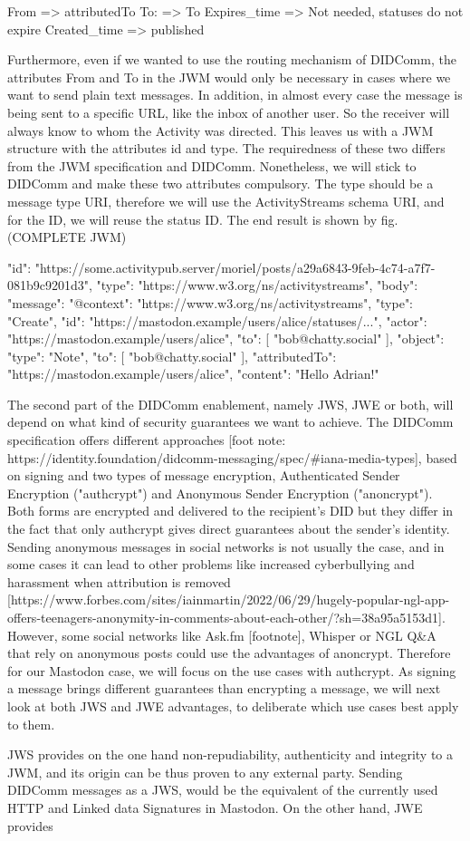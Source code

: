 From => attributedTo
To: => To 
Expires_time => Not needed, statuses do not expire
Created_time => published

Furthermore, even if we wanted to use the routing mechanism of DIDComm, the attributes From and To in the JWM would only be necessary in cases where we want to send plain text messages. In addition, in almost every case the message is being sent to a specific URL, like the inbox of another user. So the receiver will always know to whom the Activity was directed.
This leaves us with a JWM structure with the attributes id and type. The requiredness of these two differs from the JWM specification and DIDComm. Nonetheless, we will stick to DIDComm and make these two attributes compulsory. The type should be a message type URI, therefore we will use the ActivityStreams schema URI, and for the ID, we will reuse the status ID. The end result  is shown by fig. (COMPLETE JWM)

{
  "id": "https://some.activitypub.server/moriel/posts/a29a6843-9feb-4c74-a7f7-081b9c9201d3",
  "type": "https://www.w3.org/ns/activitystreams",
  "body": {
    "message": {
      "@context": "https://www.w3.org/ns/activitystreams",
      "type": "Create",
      "id": "https://mastodon.example/users/alice/statuses/...",
      "actor": "https://mastodon.example/users/alice",
      "to": [ 
            "bob@chatty.social"
        ],
      "object": {
        "type": "Note",
        "to": [ 
            "bob@chatty.social"
        ],
        "attributedTo": "https://mastodon.example/users/alice",
        "content": "Hello Adrian!"
      }
    }
  }
}

The second part of the DIDComm enablement, namely JWS, JWE or both, will depend on what kind of security guarantees we want to achieve. The DIDComm specification offers different approaches [foot note: https://identity.foundation/didcomm-messaging/spec/#iana-media-types], based on signing and two types of message encryption, Authenticated Sender Encryption ("authcrypt") and Anonymous Sender Encryption ("anoncrypt"). Both forms are encrypted and delivered to the recipient's DID but they differ in the fact that only authcrypt gives direct guarantees about the sender's identity. Sending anonymous messages in social networks is not usually the case, and in some cases it can lead to other problems like increased cyberbullying and harassment when attribution is removed [https://www.forbes.com/sites/iainmartin/2022/06/29/hugely-popular-ngl-app-offers-teenagers-anonymity-in-comments-about-each-other/?sh=38a95a5153d1]. However, some social networks like Ask.fm [footnote], Whisper or NGL Q&A that rely on anonymous posts could use the advantages of anoncrypt. Therefore for our Mastodon case, we will focus on the use cases with authcrypt. As signing a message brings different guarantees than encrypting a message, we will next look at both JWS and JWE advantages, to deliberate which use cases best apply to them. 


JWS provides on the one hand non-repudiability, authenticity and integrity to a JWM, and its origin can be thus proven to any external party. Sending DIDComm messages as a JWS, would be the equivalent of the currently used HTTP and Linked data Signatures in Mastodon. 
On the other hand, JWE provides 


